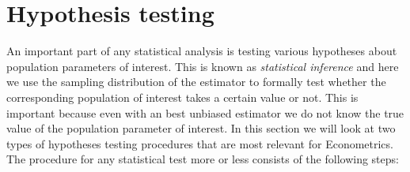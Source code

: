 \documentclass[]{book}
\theoremstyle{definition}
\theoremstyle{definition}
\theoremstyle{definition}
\theoremstyle{remark}
\begin{document}
\hypertarget{hypothesis-testing}{%
\section{Hypothesis testing}\label{hypothesis-testing}}

An important part of any statistical analysis is testing various hypotheses about population parameters of interest. This is known as \emph{statistical inference} and here we use the sampling distribution of the estimator to formally test whether the corresponding population of interest takes a certain value or not. This is important because even with an best unbiased estimator we do not know the true value of the population parameter of interest. In this section we will look at two types of hypotheses testing procedures that are most relevant for Econometrics. The procedure for any statistical test more or less consists of the following steps:
\end{document}
